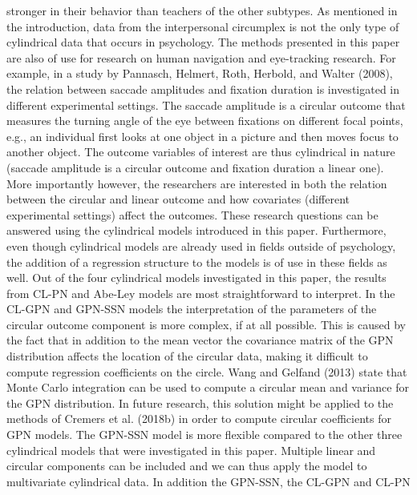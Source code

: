 \documentclass[man,mask]{apa6}
\begin{document}
stronger in their behavior than teachers of the other subtypes.\newline
\indent As mentioned in the introduction, data from the interpersonal circumplex
is not the only type of cylindrical data that occurs in psychology. The methods
presented in this paper are also of use for research on human navigation and
eye-tracking research. For example, in a study by Pannasch, Helmert, Roth, Herbold, and Walter (2008), the relation between
saccade amplitudes and fixation duration is investigated in different
experimental settings. The saccade amplitude is a circular outcome that measures
the turning angle of the eye between fixations on different focal points, e.g.,
an individual first looks at one object in a picture and then moves focus to
another object. The outcome variables of interest are thus cylindrical in nature
(saccade amplitude is a circular outcome and fixation duration a linear one).
More importantly however, the researchers are interested in both the relation
between the circular and linear outcome and how covariates (different
experimental settings) affect the outcomes. These research questions can be
answered using the cylindrical models introduced in this paper. Furthermore,
even though cylindrical models are already used in fields outside of psychology,
the addition of a regression structure to the models is of use in these fields
as well. \newline
\indent Out of the four cylindrical models investigated in this paper, the
results from CL-PN and Abe-Ley models are most straightforward to interpret. In
the CL-GPN and GPN-SSN models the interpretation of the parameters of the
circular outcome component is more complex, if at all possible. This is caused
by the fact that in addition to the mean vector the covariance matrix of the GPN
distribution affects the location of the circular data, making it difficult to
compute regression coefficients on the circle. Wang and Gelfand (2013) state that
Monte Carlo integration can be used to compute a circular mean and variance for
the GPN distribution. In future research, this solution might be applied to the
methods of Cremers et al. (2018b) in order to compute circular coefficients
for GPN models.\newline
\indent The GPN-SSN model is more flexible compared to the other three
cylindrical models that were investigated in this paper. Multiple linear and
circular components can be included and we can thus apply the model to
multivariate cylindrical data. In addition the GPN-SSN, the CL-GPN and CL-PN
\end{document}
